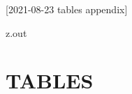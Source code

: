 [2021-08-23 tables appendix]

\begin{VerbatimOut}{z.out}
\chapter{TABLES}
\end{VerbatimOut}

\MyIO


% 
% 
